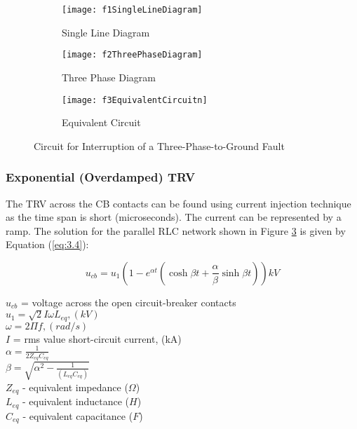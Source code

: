 \begin{figure}
    \centering
    \begin{subfigure}[b]{\textwidth}
        \centering
        \texttt{[image: f1SingleLineDiagram]}
        \caption{Single Line Diagram}
        \label{fig:Single Line Diagram}
    \end{subfigure}
    
    \begin{subfigure}[b]{\textwidth}
        \centering
        \texttt{[image: f2ThreePhaseDiagram]}
        \caption{Three Phase Diagram}
        \label{fig:Three Phase Diagram}
    \end{subfigure}

    \begin{subfigure}[b]{\textwidth}
        \centering
        \texttt{[image: f3EquivalentCircuitn]}
        \caption{Equivalent Circuit}
        \label{fig:Equivalent Circuit}
    \end{subfigure}
    \caption{Circuit for Interruption of a Three-Phase-to-Ground Fault}
    \label{fig:Circuit for Interruption of a Three-Phase-to-Ground Fault}
\end{figure}

\subsubsection{Exponential (Overdamped) TRV}
The TRV across the CB contacts can be found using current injection technique as the time span is short (microseconds). The current can be represented by a ramp. The solution for the parallel RLC network shown in Figure \ref{fig:Equivalent Circuit} is given by Equation (\ref{eq:3.4}):

\begin{equation}\label{eq:3.4}
u_{cb} = u_1 \left( 1 - e^{\alpha t} \left( \cosh \beta t + \frac{\alpha}{\beta} \sinh \beta t \right) \right) kV
\end{equation}

$u_{cb}$ =  voltage across the open circuit-breaker contacts\\
$u_1 = \sqrt{2} I \omega L_{eq}, (kV)$\\
$\omega = 2 \Pi f, (rad/s)$\\
$I$ = rms value short-circuit current, (kA)\\
$\alpha = \frac{1}{2 Z_{eq} C_{eq}}$\\
$\beta =\sqrt{\alpha^2 - \frac{1}{(L_{eq} C_{eq})}}$\\
$Z_{eq}$ - equivalent impedance ($\Omega$)\\
$L_{eq}$ - equivalent inductance ($H$)\\
$C_{eq}$ - equivalent capacitance ($F$)\\

